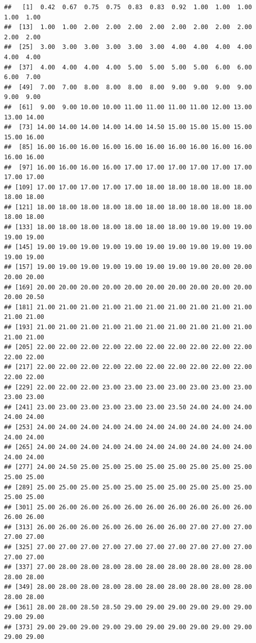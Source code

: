 \documentclass[11pt,]{book}
\begin{document}
\begin{verbatim}
##   [1]  0.42  0.67  0.75  0.75  0.83  0.83  0.92  1.00  1.00  1.00  1.00  1.00
##  [13]  1.00  1.00  2.00  2.00  2.00  2.00  2.00  2.00  2.00  2.00  2.00  2.00
##  [25]  3.00  3.00  3.00  3.00  3.00  3.00  4.00  4.00  4.00  4.00  4.00  4.00
##  [37]  4.00  4.00  4.00  4.00  5.00  5.00  5.00  5.00  6.00  6.00  6.00  7.00
##  [49]  7.00  7.00  8.00  8.00  8.00  8.00  9.00  9.00  9.00  9.00  9.00  9.00
##  [61]  9.00  9.00 10.00 10.00 11.00 11.00 11.00 11.00 12.00 13.00 13.00 14.00
##  [73] 14.00 14.00 14.00 14.00 14.00 14.50 15.00 15.00 15.00 15.00 15.00 16.00
##  [85] 16.00 16.00 16.00 16.00 16.00 16.00 16.00 16.00 16.00 16.00 16.00 16.00
##  [97] 16.00 16.00 16.00 16.00 17.00 17.00 17.00 17.00 17.00 17.00 17.00 17.00
## [109] 17.00 17.00 17.00 17.00 17.00 18.00 18.00 18.00 18.00 18.00 18.00 18.00
## [121] 18.00 18.00 18.00 18.00 18.00 18.00 18.00 18.00 18.00 18.00 18.00 18.00
## [133] 18.00 18.00 18.00 18.00 18.00 18.00 18.00 19.00 19.00 19.00 19.00 19.00
## [145] 19.00 19.00 19.00 19.00 19.00 19.00 19.00 19.00 19.00 19.00 19.00 19.00
## [157] 19.00 19.00 19.00 19.00 19.00 19.00 19.00 19.00 20.00 20.00 20.00 20.00
## [169] 20.00 20.00 20.00 20.00 20.00 20.00 20.00 20.00 20.00 20.00 20.00 20.50
## [181] 21.00 21.00 21.00 21.00 21.00 21.00 21.00 21.00 21.00 21.00 21.00 21.00
## [193] 21.00 21.00 21.00 21.00 21.00 21.00 21.00 21.00 21.00 21.00 21.00 21.00
## [205] 22.00 22.00 22.00 22.00 22.00 22.00 22.00 22.00 22.00 22.00 22.00 22.00
## [217] 22.00 22.00 22.00 22.00 22.00 22.00 22.00 22.00 22.00 22.00 22.00 22.00
## [229] 22.00 22.00 22.00 23.00 23.00 23.00 23.00 23.00 23.00 23.00 23.00 23.00
## [241] 23.00 23.00 23.00 23.00 23.00 23.00 23.50 24.00 24.00 24.00 24.00 24.00
## [253] 24.00 24.00 24.00 24.00 24.00 24.00 24.00 24.00 24.00 24.00 24.00 24.00
## [265] 24.00 24.00 24.00 24.00 24.00 24.00 24.00 24.00 24.00 24.00 24.00 24.00
## [277] 24.00 24.50 25.00 25.00 25.00 25.00 25.00 25.00 25.00 25.00 25.00 25.00
## [289] 25.00 25.00 25.00 25.00 25.00 25.00 25.00 25.00 25.00 25.00 25.00 25.00
## [301] 25.00 26.00 26.00 26.00 26.00 26.00 26.00 26.00 26.00 26.00 26.00 26.00
## [313] 26.00 26.00 26.00 26.00 26.00 26.00 26.00 27.00 27.00 27.00 27.00 27.00
## [325] 27.00 27.00 27.00 27.00 27.00 27.00 27.00 27.00 27.00 27.00 27.00 27.00
## [337] 27.00 28.00 28.00 28.00 28.00 28.00 28.00 28.00 28.00 28.00 28.00 28.00
## [349] 28.00 28.00 28.00 28.00 28.00 28.00 28.00 28.00 28.00 28.00 28.00 28.00
## [361] 28.00 28.00 28.50 28.50 29.00 29.00 29.00 29.00 29.00 29.00 29.00 29.00
## [373] 29.00 29.00 29.00 29.00 29.00 29.00 29.00 29.00 29.00 29.00 29.00 29.00

\end{verbatim}
\end{document}
